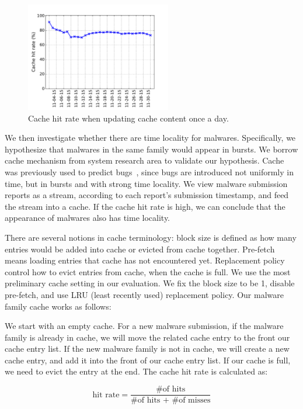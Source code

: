 \begin{figure}[t!]
\begin{center}
\includegraphics[width=2.5in]{figure/LRU_day}
\caption{Cache hit rate when updating cache content once a day.}
\label{fig:batchcache}
\end{center}
\end{figure}

We then investigate whether there are time locality for malwares.
Specifically, we hypothesize that malwares in the same family would appear in bursts.  
We borrow cache mechanism from system research area to validate our hypothesis. 
Cache was previously used to predict bugs~\cite{predicting}, 
since bugs are introduced not uniformly in time, but in bursts and with strong time locality. 
We view malware submission reports as a stream, 
according to each report’s submission timestamp, and feed the stream into a cache. 
If the cache hit rate is high, 
we can conclude that the appearance of malwares also has time locality. 

There are several notions in cache terminology: 
block size is defined as how many entries would be added into cache or evicted from cache together.
Pre-fetch means loading entries that cache has not encountered yet. 
Replacement policy control how to evict entries from cache, when the cache is full. 
We use the most preliminary cache setting in our evaluation. We fix the block size to be 1, disable pre-fetch, 
and use LRU (least recently used) replacement policy.
Our malware family cache works as follows:  

We start with an empty cache. 
For a new malware submission, if the malware family is already in cache, 
we will move the related cache entry to the front our cache entry list. 
If the new malware family is not in cache, 
we will create a new cache entry, and add it into the front of our cache entry list. 
If our cache is full, we need to evict the entry at the end. 
The cache hit rate is calculated as: 

$$ \mbox{hit rate} = \dfrac{\mbox{\# of hits}}{\mbox{\# of hits + \# of misses}}$$




